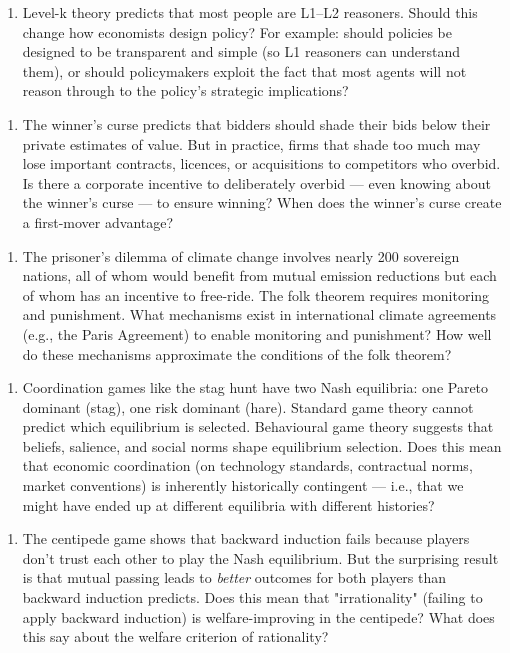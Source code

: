 \documentclass[12pt, letterpaper]{article}
\begin{document}
\begin{enumerate}
\item Level-k theory predicts that most people are L1--L2 reasoners. Should this change how economists design policy? For example: should policies be designed to be transparent and simple (so L1 reasoners can understand them), or should policymakers exploit the fact that most agents will not reason through to the policy's strategic implications?
\end{enumerate}

\begin{enumerate}
\item The winner's curse predicts that bidders should shade their bids below their private estimates of value. But in practice, firms that shade too much may lose important contracts, licences, or acquisitions to competitors who overbid. Is there a corporate incentive to deliberately overbid --- even knowing about the winner's curse --- to ensure winning? When does the winner's curse create a first-mover advantage?
\end{enumerate}

\begin{enumerate}
\item The prisoner's dilemma of climate change involves nearly 200 sovereign nations, all of whom would benefit from mutual emission reductions but each of whom has an incentive to free-ride. The folk theorem requires monitoring and punishment. What mechanisms exist in international climate agreements (e.g., the Paris Agreement) to enable monitoring and punishment? How well do these mechanisms approximate the conditions of the folk theorem?
\end{enumerate}

\begin{enumerate}
\item Coordination games like the stag hunt have two Nash equilibria: one Pareto dominant (stag), one risk dominant (hare). Standard game theory cannot predict which equilibrium is selected. Behavioural game theory suggests that beliefs, salience, and social norms shape equilibrium selection. Does this mean that economic coordination (on technology standards, contractual norms, market conventions) is inherently historically contingent --- i.e., that we might have ended up at different equilibria with different histories?
\end{enumerate}

\begin{enumerate}
\item The centipede game shows that backward induction fails because players don't trust each other to play the Nash equilibrium. But the surprising result is that mutual passing leads to \textit{better} outcomes for both players than backward induction predicts. Does this mean that "irrationality" (failing to apply backward induction) is welfare-improving in the centipede? What does this say about the welfare criterion of rationality?
\end{enumerate}
\end{document}
